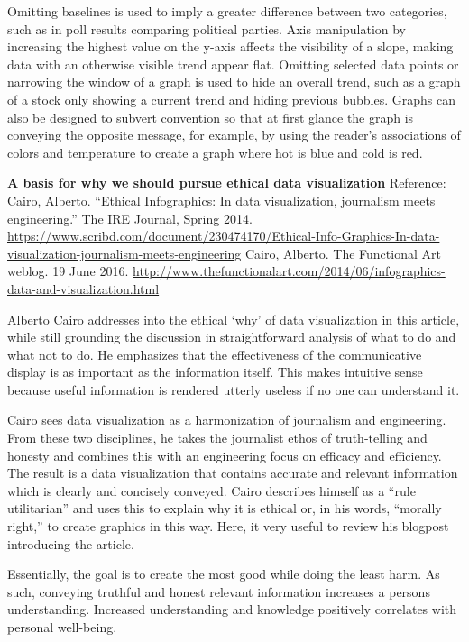 \documentclass[]{book}
\theoremstyle{definition}
\theoremstyle{definition}
\theoremstyle{definition}
\theoremstyle{remark}
\begin{document}
Omitting baselines is used to imply a greater difference between two
categories, such as in poll results comparing political parties. Axis
manipulation by increasing the highest value on the y-axis affects the
visibility of a slope, making data with an otherwise visible trend
appear flat. Omitting selected data points or narrowing the window of a
graph is used to hide an overall trend, such as a graph of a stock only
showing a current trend and hiding previous bubbles. Graphs can also be
designed to subvert convention so that at first glance the graph is
conveying the opposite message, for example, by using the reader's
associations of colors and temperature to create a graph where hot is
blue and cold is red.

\textbf{A basis for why we should pursue ethical data visualization}
Reference: Cairo, Alberto. ``Ethical Infographics: In data
visualization, journalism meets engineering.'' The IRE Journal, Spring
2014.
\url{https://www.scribd.com/document/230474170/Ethical-Info-Graphics-In-data-visualization-journalism-meets-engineering}
Cairo, Alberto. The Functional Art weblog. 19 June 2016.
\url{http://www.thefunctionalart.com/2014/06/infographics-data-and-visualization.html}

Alberto Cairo addresses into the ethical `why' of data visualization in
this article, while still grounding the discussion in straightforward
analysis of what to do and what not to do. He emphasizes that the
effectiveness of the communicative display is as important as the
information itself. This makes intuitive sense because useful
information is rendered utterly useless if no one can understand it.

Cairo sees data visualization as a harmonization of journalism and
engineering. From these two disciplines, he takes the journalist ethos
of truth-telling and honesty and combines this with an engineering focus
on efficacy and efficiency. The result is a data visualization that
contains accurate and relevant information which is clearly and
concisely conveyed. Cairo describes himself as a ``rule utilitarian''
and uses this to explain why it is ethical or, in his words, ``morally
right,'' to create graphics in this way. Here, it very useful to review
his blogpost introducing the article.

Essentially, the goal is to create the most good while doing the least
harm. As such, conveying truthful and honest relevant information
increases a persons understanding. Increased understanding and knowledge
positively correlates with personal well-being.
\end{document}
